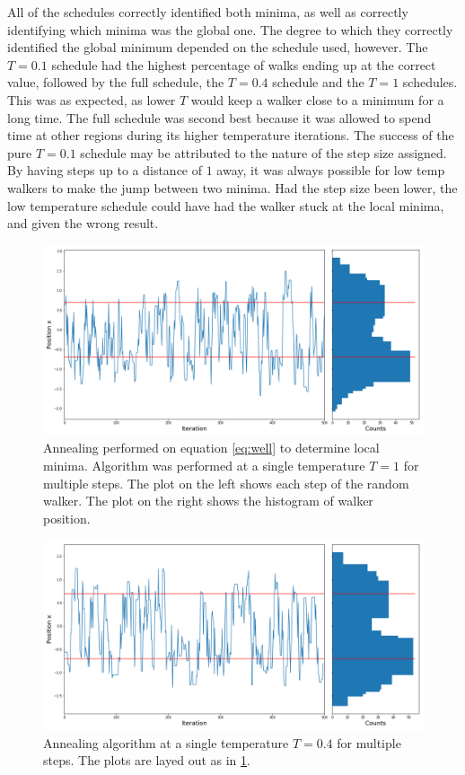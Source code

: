 \documentclass[twocolumn]{article}
\begin{document}
All of the schedules correctly identified both minima, as well as correctly identifying which minima was the global one. The degree to which they correctly identified the global minimum depended on the schedule used, however. The $T=0.1$ schedule had the highest percentage of walks ending up at the correct value, followed by the full schedule, the $T=0.4$ schedule and the $T=1$ schedules. This was as expected, as lower $T$ would keep a walker close to a minimum for a long time. The full schedule was second best because it was allowed to spend time at other regions during its higher temperature iterations. The success of the pure $T=0.1$ schedule may be attributed to the nature of the step size assigned. By having steps up to a distance of $1$ away, it was always possible for low temp walkers to make the jump between two minima. Had the step size been lower, the low temperature schedule could have had the walker stuck at the local minima, and given the wrong result.

\begin{figure}
\centering
\includegraphics[width=\linewidth]{annealT1}
\caption{Annealing performed on equation \ref{eq:well} to determine local minima. Algorithm was performed at a single temperature $T=1$ for multiple steps. The plot on the left shows each step of the random walker. The plot on the right shows the histogram of walker position.}
\label{fig:annealT1}
\end{figure}

\begin{figure}
	\centering
	\includegraphics[width=\linewidth]{annealT04}
	\caption{Annealing algorithm at a single temperature $T=0.4$ for multiple steps. The plots are layed out as in \ref{fig:annealT1}.}
	\label{fig:annealT04}
\end{figure}
\end{document}
